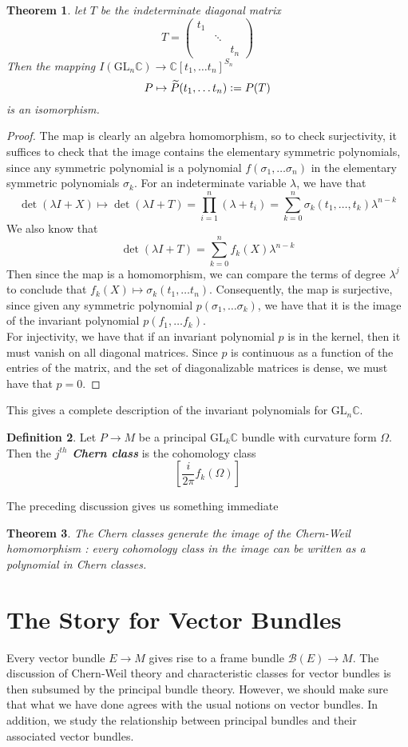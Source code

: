 \documentclass[psamsfonts, 12pt]{amsart}
\newtheorem{thm}{Theorem}[section]
\theoremstyle{definition}
\newtheorem{defn}[thm]{Definition}
\theoremstyle{remark}
\newcommand{\ib}[1]{\textbf{\textit{#1}}}
\newcommand{\C}{\mathbb{C}}
\newcommand{\GL}{\mathrm{GL}}
\newcommand{\defeq}{\vcentcolon=}
\begin{document}
%
\begin{thm}
let $T$ be the indeterminate diagonal matrix
\[
T = \begin{pmatrix}
t_1 & ~ & ~ \\
~ & \ddots & ~ \\
~ & ~ & t_n
\end{pmatrix}
\]
Then the mapping $I(\GL_n\C) \to \C[t_1,\ldots t_n]^{S_n}$
\[
P \mapsto \widetilde{P}(t_1,\ldots t_n) \defeq P(T)
\]
is an isomorphism.
\end{thm}
%
\begin{proof}
The map is clearly an algebra homomorphism, so to check surjectivity, it suffices
to check that the image contains the elementary symmetric polynomials, since any
symmetric polynomial is a polynomial $f(\sigma_1, \ldots \sigma_n)$ in the
elementary symmetric polynomials $\sigma_k$. For an indeterminate variable
$\lambda$, we have that
\[
\det(\lambda I + X) \mapsto \det(\lambda I + T) = \prod_{i=1}^n (\lambda+t_i)
= \sum_{k=0}^n\sigma_k(t_1,\ldots,t_k)\lambda^{n-k}
\]
We also know that
\[
\det(\lambda I + T) = \sum_{k=0}^n f_k(X)\lambda^{n-k}
\]
Then since the map is a homomorphism, we can compare the terms of degree $\lambda^j$
to conclude that  $f_k(X) \mapsto \sigma_k(t_1,\ldots t_n)$. Consequently, the map is
surjective, since given any symmetric polynomial $p(\sigma_1,\ldots \sigma_k)$,
we have that it is the image of the invariant polynomial $p(f_1,\ldots f_k)$. \\

For injectivity, we have that if an invariant polynomial $p$ is in the kernel, then
it must vanish on all diagonal matrices. Since $p$ is continuous as a function of
the entries of the matrix, and the set of diagonalizable matrices is dense,
we must have that $p = 0$.
\end{proof}
%
This gives a complete description of the invariant polynomials for $\GL_n\C$.
%
\begin{defn}
Let $P \to M$ be a principal $\GL_k\C$ bundle  with curvature form $\Omega$.
Then the \ib{$j^{th}$ Chern class} is the cohomology class
\[
\left[\frac{i}{2\pi}f_k(\Omega)\right]
\]
\end{defn}
%
The preceding discussion gives us something immediate
%
\begin{thm}
The Chern classes generate the image of the Chern-Weil homomorphism : every
cohomology class in the image can be written as a polynomial in Chern classes.
\end{thm}
%
\section{The Story for Vector Bundles}
%
Every vector bundle $E \to M$ gives rise to a frame bundle $\mathcal{B}(E) \to M$.
The discussion of Chern-Weil theory and characteristic classes for vector
bundles is then subsumed by the principal bundle theory. However, we should
make sure that what we have done agrees with the usual notions on vector bundles.
In addition, we study the relationship between principal bundles and their
associated vector bundles.
%
\end{document}
